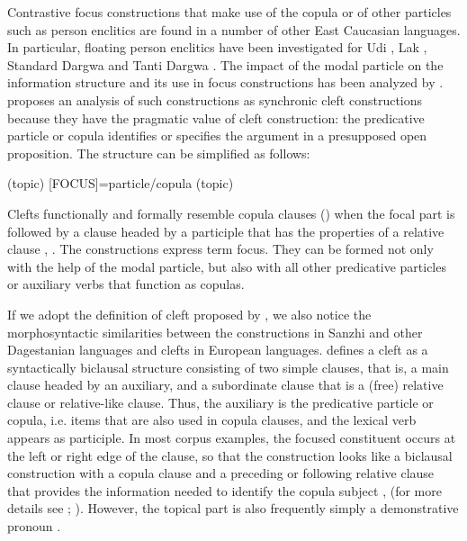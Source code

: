 Contrastive focus constructions that make use of the copula or of other particles such as person enclitics are found in a number of other East Caucasian languages. In particular, floating person enclitics have been investigated for Udi \citep{Harris2001, Harris2002}, Lak \citep{Kazenin2002}, Standard Dargwa \citep{Xajdakov1986} and Tanti Dargwa \citep{Sumbatova2013}. The impact of the modal particle on the information structure and its use in focus constructions has been analyzed by \citet{ForkerSubmittedc}. \citet{Kazenin2002} proposes an analysis of such constructions as synchronic cleft constructions because they have the pragmatic value of cleft construction: the predicative particle or copula identifies or specifies the argument in a presupposed open proposition. The structure can be simplified as follows:
%
\begin{exe}
	\ex	(topic) [FOCUS]=particle/copula (topic) \label{ex:topic focus particlecopula topic}
\end{exe}

Clefts functionally and formally resemble copula clauses () when the focal part is followed by a clause headed by a participle that has the properties of a relative clause ,  . The constructions express term focus. They can be formed not only with the help of the modal particle, but also with all other predicative particles or auxiliary verbs that function as copulas.

If we adopt the definition of cleft proposed by \citet{Lambrecht2001}, we also notice the morphosyntactic similarities between the constructions in Sanzhi and other Dagestanian languages and clefts in European languages.  defines a cleft as a syntactically biclausal structure consisting of two simple clauses, that is, a main clause headed by an auxiliary, and a subordinate clause that is a (free) relative clause or relative-like clause. Thus, the auxiliary is the predicative particle or copula, i.e. items that are also used in copula clauses, and the lexical verb appears as participle. In most corpus examples, the focused constituent occurs at the left or right edge of the clause, so that the construction looks like a biclausal construction with a copula clause and a preceding or following relative clause that provides the information needed to identify the copula subject ,   (for more details see \citealt{Kazenin2002}; \citealt{Forker2016a}). However, the topical part is also frequently simply a demonstrative pronoun .

